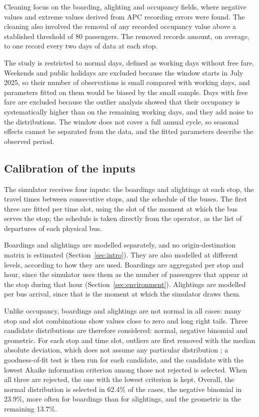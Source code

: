 \documentclass[a4paper,fleqn]{cas-sc}
\begin{document}
Cleaning focus on the boarding, alighting and occupancy fields, where
negative values and extreme values derived from APC recording errors were found.
The cleaning also involved the removal of any recorded occupancy value above
a stablished threshold of 80 passengers.
The removed records amount, on average, to one record
every two days of data at each stop.

The study is restricted to normal days, defined as working days without free
fare. Weekends and public holidays are excluded because the window starts in
July 2025, so their number of observations is small compared with working
days, and parameters fitted on them would be biased by the small sample. Days
with free fare are excluded because the outlier analysis showed that their
occupancy is systematically higher than on the remaining working days, and
they add noise to the distributions. The window does not cover a full annual
cycle, so seasonal effects cannot be separated from the data, and the fitted
parameters describe the observed period.

\subsection{Calibration of the inputs}\label{sec:data_inputs}

The simulator receives four inputs: the boardings and alightings at each stop,
the travel times between consecutive stops, and the schedule of the buses.
The first three are fitted per time slot, using the slot of the moment at
which the bus serves the stop; the schedule is taken directly from the
operator, as the list of departures of each physical bus.

Boardings and alightings are modelled separately, and no origin-destination
matrix is estimated (Section~\ref{sec:intro}). They are also modelled at
different levels, according to how they are used. Boardings are aggregated
per stop and hour, since the simulator uses them as the number of passengers
that appear at the stop during that hour
(Section~\ref{sec:environment}). Alightings are modelled per bus arrival,
since that is the moment at which the simulator draws them.

Unlike occupancy, boardings and alightings are not normal in all cases: many
stop and slot combinations show values close to zero and long right tails.
Three candidate distributions are therefore considered: normal, negative
binomial and geometric. For each stop and time slot, outliers are first
removed with the median absolute deviation, which does not assume any
particular distribution \cite{leys2013detecting}; a goodness-of-fit test is
then run for each candidate, and the candidate with the lowest Akaike
information criterion \cite{akaike1974new} among those not rejected is
selected. When all three are rejected, the one with the lowest criterion is
kept. Overall, the normal distribution is selected in 62.4\% of the cases, the
negative binomial in 23.9\%, more often for boardings than for alightings, and
the geometric in the remaining 13.7\%.
\end{document}
